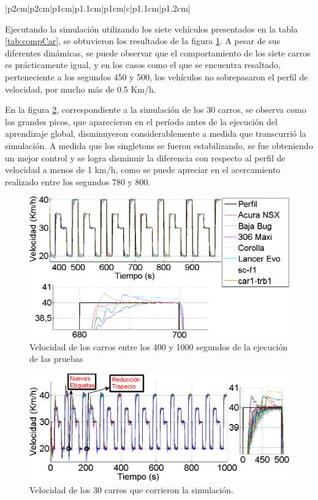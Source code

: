 \begin{table}[h]
\begin{minipage}[b]{\linewidth}
\begin{tabular}{|p{2cm}|p{2cm}|p{1cm}|p{1.1cm}|p{1cm}|c|p{1.1cm}|p{1.2cm}|}
\end{tabular}
\caption{Tabla comparativa de los atributos de los vehículos}
\label{tab:compCar}
\end{minipage}
\end{table}

Ejecutando la simulación utilizando los siete vehículos presentados en la tabla \ref{tab:compCar}, se obtuvieron los resultados de la figura \ref{fig:7cars}. A pesar de sus diferentes dinámicas, se puede observar que el comportamiento de los siete carros es prácticamente igual, y en los casos como el que se encuentra resaltado, perteneciente a los segundos 450 y 500, los vehículos no sobrepasaron el perfil de velocidad, por mucho más de 0.5 Km/h. 

En la figura \ref{fig:31cars}, correspondiente a la simulación de los 30 carros, se observa como los grandes picos, que aparecieron en el período antes de la ejecución del aprendizaje global, disminuyeron considerablemente a medida que transcurrió la simulación. A medida que los singletons se fueron estabilizando, se fue obteniendo un mejor control y se logra disminuir la diferencia con respecto al perfil de velocidad a menos de 1 km/h, como se puede apreciar en el acercamiento realizado entre los segundos 780 y 800.   

\begin{minipage}{1\linewidth}
\end{minipage}
\begin{figure}[htb]
\centering
\includegraphics[width=0.6\linewidth,type=png,ext=.png,read=.png]{figures/7cars}
\caption{Velocidad de los carros entre los 400 y 1000 segundos de la ejecución de las pruebas}
\label{fig:7cars}
\end{figure}  
  
\begin{figure}[htb]
\centering
\includegraphics[width=0.6\linewidth,type=png,ext=.png,read=.png]{figures/31cars}
\caption{Velocidad de los 30 carros que corrieron la simulación.}
\label{fig:31cars}
\end{figure}


